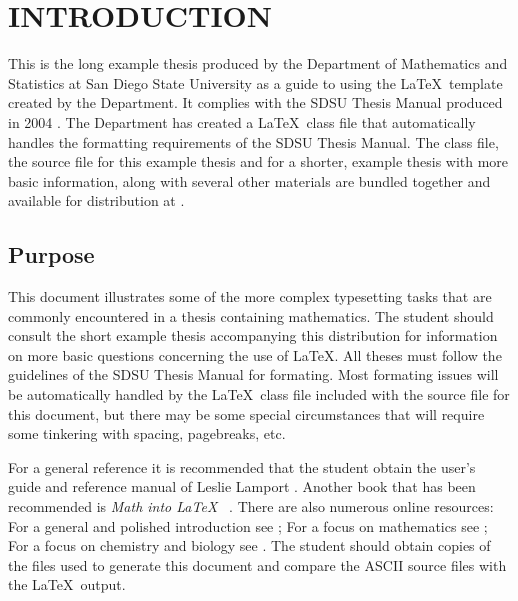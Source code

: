 
\chapter{INTRODUCTION}
\label{c:intro}

This is the long example thesis produced by the  Department of
Mathematics and Statistics at San Diego State University
as a guide to using the \LaTeX\ template created by the Department.
It complies with the SDSU Thesis Manual produced in 2004
\cite{SDSUthesismanual}. 
The Department has created a \LaTeX\ class file that automatically
handles the formatting requirements of the SDSU Thesis Manual.  The
class file, the source file for this example thesis and for a shorter,
example thesis with more basic information, along with several other
materials are bundled together and available for distribution at
\cite{SDSUMath_thesis}. 

\section{Purpose}
\label{s:purpose}
This document  illustrates some of the more complex typesetting tasks
that are commonly encountered in a thesis containing mathematics.
The student should consult the  short example thesis
accompanying this distribution for information on more basic questions 
concerning the use of \LaTeX. All theses 
must follow the guidelines of the  SDSU Thesis Manual for formating. 
Most formating issues will be automatically handled by the \LaTeX\
class file included with the source file for this document, but there
may be some special circumstances that will require some tinkering
with spacing, pagebreaks, etc.

For a general reference it is recommended that the
student obtain the user's guide and reference manual of Leslie Lamport
\cite{LAM}. Another book that has been recommended is {\em Math into
  \LaTeX\ } \cite{Gra}. 
There are also numerous online resources:  For a general and polished
introduction see \cite{indian_tutorial}; For a focus on mathematics
see \cite{uiuc_tutorial}; For a focus on chemistry and biology see
\cite{microbio_resources}.
 The student should obtain copies of the files used to
generate this document and compare the ASCII source files with 
the \LaTeX\ output.

